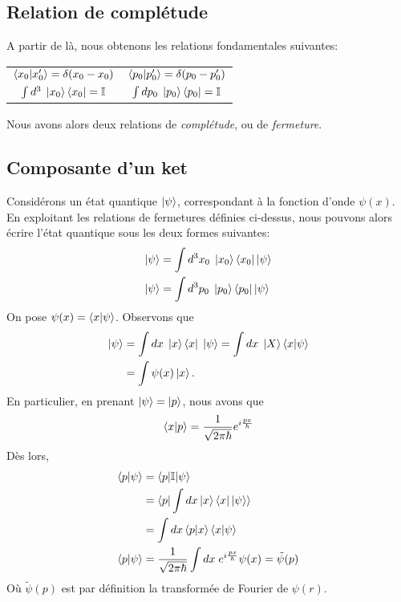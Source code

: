 \documentclass[../Notesdecours.tex]{subfiles}
\begin{document}
\subsection{Relation de complétude} \label{complétude}
A partir de là, nous obtenons les relations fondamentales suivantes:
\begin{center}
\begin{tabular}{c|c}
$\braket{x_0|x_0'} = \delta (x_0 - x_0)$ & $\braket{p_0|p_0'} = \delta (p_0-p_0')$\\
$\int d^3 \; \ket{x_0}\bra{x_0} = \mathbb{I}$ & $\int dp_0 \; \ket{p_0}\bra{p_0} = \mathbb{I}$
\end{tabular}
\end{center}
Nous avons alors deux relations de \emph{complétude}, ou de \emph{fermeture}.

\subsection{Composante d'un ket}
Considérons un état quantique $\ket{\psi}$, correspondant à la fonction d'onde $\psi(x)$. En exploitant les relations de fermetures définies ci-dessus, nous pouvons alors écrire l'état quantique sous les deux formes suivantes:
\begin{align}
\ket{\psi} &= \int d^3x_0 \; \ket{x_0} \bra{x_0} \ket{\psi}\\
\ket{\psi} &= \int d^3p_0 \; \ket{p_0} \bra{p_0} \ket{\psi}
\end{align}
On pose $\psi(x) = \braket{x|\psi}$. Observons que
\begin{align}
\ket{\psi} &= \int dx \; \ket{x}\bra{x} \; \ket{\psi} = \int dx \; \ket{X} \braket{x|\psi}\\
&= \int \psi(x)\ket{x}.
\end{align}
En particulier, en prenant $\ket{\psi} = \ket{p}$, nous avons que
\begin{equation}
\braket{x|p} = \frac{1}{\sqrt{2\pi\hbar}}e^{i \frac{px}{\hbar}}
\end{equation}
Dès lors, 
\begin{align}
\braket{p|\psi} &= \braket{p|\mathbb{I}|\psi}\notag\\
&= \braket{p|\int dx \ket{x}\bra{x} \ket{\psi}}\notag\\
&= \int dx \braket{p|x}\braket{x|\psi}\notag\\
\braket{p|\psi} &= \frac{1}{\sqrt{2\pi\hbar}}\int dx \; e^{i \frac{px}{\hbar}}\psi(x) = \tilde{\psi}(p)
\end{align}
Où $\tilde{\psi}(p)$ est par définition la transformée de Fourier de $\psi(r)$.\\
\end{document}
